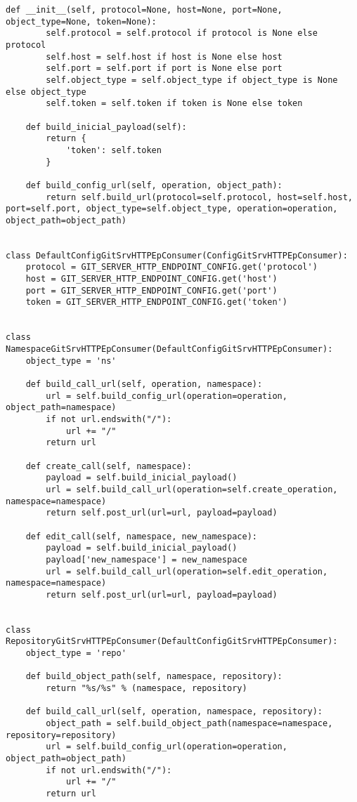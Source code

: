 \begin{lstlisting}[breaklines]
    def __init__(self, protocol=None, host=None, port=None, object_type=None, token=None):
        self.protocol = self.protocol if protocol is None else protocol
        self.host = self.host if host is None else host
        self.port = self.port if port is None else port
        self.object_type = self.object_type if object_type is None else object_type
        self.token = self.token if token is None else token

    def build_inicial_payload(self):
        return {
            'token': self.token
        }

    def build_config_url(self, operation, object_path):
        return self.build_url(protocol=self.protocol, host=self.host, port=self.port, object_type=self.object_type, operation=operation, object_path=object_path)


class DefaultConfigGitSrvHTTPEpConsumer(ConfigGitSrvHTTPEpConsumer):
    protocol = GIT_SERVER_HTTP_ENDPOINT_CONFIG.get('protocol')
    host = GIT_SERVER_HTTP_ENDPOINT_CONFIG.get('host')
    port = GIT_SERVER_HTTP_ENDPOINT_CONFIG.get('port')
    token = GIT_SERVER_HTTP_ENDPOINT_CONFIG.get('token')


class NamespaceGitSrvHTTPEpConsumer(DefaultConfigGitSrvHTTPEpConsumer):
    object_type = 'ns'

    def build_call_url(self, operation, namespace):
        url = self.build_config_url(operation=operation, object_path=namespace)
        if not url.endswith("/"):
            url += "/"
        return url

    def create_call(self, namespace):
        payload = self.build_inicial_payload()
        url = self.build_call_url(operation=self.create_operation, namespace=namespace)
        return self.post_url(url=url, payload=payload)

    def edit_call(self, namespace, new_namespace):
        payload = self.build_inicial_payload()
        payload['new_namespace'] = new_namespace
        url = self.build_call_url(operation=self.edit_operation, namespace=namespace)
        return self.post_url(url=url, payload=payload)


class RepositoryGitSrvHTTPEpConsumer(DefaultConfigGitSrvHTTPEpConsumer):
    object_type = 'repo'

    def build_object_path(self, namespace, repository):
        return "%s/%s" % (namespace, repository)

    def build_call_url(self, operation, namespace, repository):
        object_path = self.build_object_path(namespace=namespace, repository=repository)
        url = self.build_config_url(operation=operation, object_path=object_path)
        if not url.endswith("/"):
            url += "/"
        return url


\end{lstlisting}

